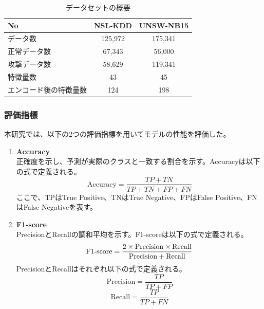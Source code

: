\documentclass{css}
\begin{document}
\begin{table}[h]
    \centering
    \caption{データセットの概要}\label{tab:data1}
    \begin{tabular}{lcc}
    \hline\hline
    No & NSL-KDD & UNSW-NB15 \\
    \hline
    データ数 & 125,972 & 175,341 \\
    正常データ数 & 67,343 & 56,000 \\
    攻撃データ数 & 58,629 & 119,341 \\
    特徴量数 & 43 & 45 \\
    エンコード後の特徴量数 & 124 & 198 \\
    \hline
    \end{tabular}
\end{table}

\subsubsection{評価指標}
本研究では、以下の2つの評価指標を用いてモデルの性能を評価した。

\begin{enumerate}
    \item \textbf{Accuracy}\\
        正確度を示し、予測が実際のクラスと一致する割合を示す。Accuracyは以下の式で定義される。
        \begin{equation}
            \mathrm{Accuracy} = \frac{TP + TN}{TP + TN + FP + FN}
        \end{equation}
        ここで、TPはTrue Positive、TNはTrue Negative、FPはFalse Positive、FNはFalse Negativeを表す。
    
    \item \textbf{F1-score}\\
        PrecisionとRecallの調和平均を示す。F1-scoreは以下の式で定義される。
        \begin{equation}
            \mathrm{F1\mathchar`-score} = \frac{2 \times \mathrm{Precision} \times \mathrm{Recall}}{\mathrm{Precision} + \mathrm{Recall}}
        \end{equation}
        PrecisionとRecallはそれぞれ以下の式で定義される。
        \begin{equation}
            \mathrm{Precision} = \frac{TP}{TP + FP}
        \end{equation}
        \begin{equation}
            \mathrm{Recall} = \frac{TP}{TP + FN}
        \end{equation}
\end{enumerate}
\end{document}
